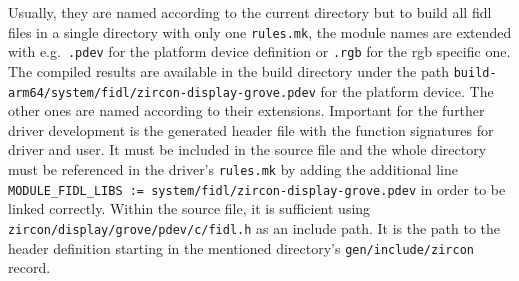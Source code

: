 Usually, they are named according to the current directory but to build all \ac{fidl} files in a single directory with only one \texttt{rules.mk}, the module names are extended with e.g.\ \texttt{.pdev} for the platform device definition or \texttt{.rgb} for the \ac{rgb} specific one. 
The compiled results are available in the build directory under the path \texttt{build-arm64/system/fidl/zircon-display-grove.pdev} for the platform device.
The other ones are named according to their extensions.
Important for the further driver development is the generated header file with the function signatures for driver and user.
It must be included in the source file and the whole directory must be referenced in the driver's \texttt{rules.mk} by adding the additional line \texttt{MODULE_FIDL_LIBS := system/fidl/zircon-display-grove.pdev} in order to be linked correctly.
Within the source file, it is sufficient using \\ \texttt{zircon/display/grove/pdev/c/fidl.h} as an include path.
It is the path to the header definition starting in the mentioned directory's \texttt{gen/include/zircon} record.

